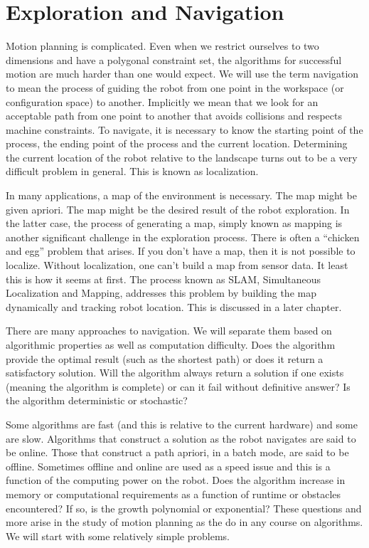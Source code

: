 \hypertarget{exploration-and-navigation}{%
\section{Exploration and Navigation}\label{exploration-and-navigation}}

Motion planning is complicated. Even when we restrict ourselves to two
dimensions and have a polygonal constraint set, the algorithms for
successful motion are much harder than one would expect. We will use the
term navigation to mean the process of guiding the robot from one point
in the workspace (or configuration space) to another. Implicitly we mean
that we look for an acceptable path from one point to another that
avoids collisions and respects machine constraints. To navigate, it is
necessary to know the starting point of the process, the ending point of
the process and the current location. Determining the current location
of the robot relative to the landscape turns out to be a very difficult
problem in general. This is known as localization.

In many applications, a map of the environment is necessary. The map
might be given apriori. The map might be the desired result of the robot
exploration. In the latter case, the process of generating a map, simply
known as mapping is another significant challenge in the exploration
process. There is often a ``chicken and egg'' problem that arises. If
you don't have a map, then it is not possible to localize. Without
localization, one can't build a map from sensor data. It least this is
how it seems at first. The process known as SLAM, Simultaneous
Localization and Mapping, addresses this problem by building the map
dynamically and tracking robot location. This is discussed in a later
chapter.

There are many approaches to navigation. We will separate them based on
algorithmic properties as well as computation difficulty. Does the
algorithm provide the optimal result (such as the shortest path) or does
it return a satisfactory solution. Will the algorithm always return a
solution if one exists (meaning the algorithm is complete) or can it
fail without definitive answer? Is the algorithm deterministic or
stochastic?

Some algorithms are fast (and this is relative to the current hardware)
and some are slow. Algorithms that construct a solution as the robot
navigates are said to be online. Those that construct a path apriori, in
a batch mode, are said to be offline. Sometimes offline and online are
used as a speed issue and this is a function of the computing power on
the robot. Does the algorithm increase in memory or computational
requirements as a function of runtime or obstacles encountered? If so,
is the growth polynomial or exponential? These questions and more arise
in the study of motion planning as the do in any course on algorithms.
We will start with some relatively simple problems.

